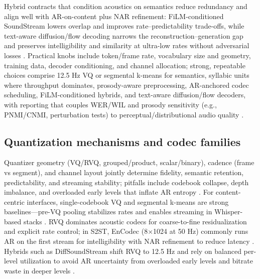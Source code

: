\documentclass{article}
\begin{document}
Hybrid contracts that condition acoustics on semantics reduce redundancy and align well with AR-on-content plus NAR refinement: FiLM-conditioned SoundStream lowers overlap and improves rate--predictability trade-offs, while text-aware diffusion/flow decoding narrows the reconstruction--generation gap and preserves intelligibility and similarity at ultra-low rates without adversarial losses \cite{yang2025diffsoundstreamefficientspeechtokenizati,peng2024mslms2stmultitaskspeechlanguagemodeltext,wang2025tadicodectextawarediffusionspeechtokeniz}. Practical knobs include token/frame rate, vocabulary size and geometry, training data, decoder conditioning, and channel allocation; strong, repeatable choices comprise 12.5 Hz VQ or segmental k-means for semantics, syllabic units where throughput dominates, prosody-aware preprocessing, AR-anchored codec scheduling, FiLM-conditioned hybrids, and text-aware diffusion/flow decoders, with reporting that couples WER/WIL and prosody sensitivity (e.g., PNMI/CNMI, perturbation tests) to perceptual/distributional audio quality \cite{zeng2024scalingspeechtextpretrainingsyntheticint,kando2025exploringeffectsegmentationvocabularysiz,baade2024syllablelmlearningcoarsesemanticunitsspe,onda2025benchmarkingprosodyencodingdiscretespeec,li2024investigatingneuralaudiocodecsspeechlang,yang2025diffsoundstreamefficientspeechtokenizati,wang2025tadicodectextawarediffusionspeechtokeniz,guo2025recentadvancesdiscretespeechtokensreview}.

\subsection{Quantization mechanisms and codec families} \label{subsec:quantizationmechanismsandcodecfamilies}
Quantizer geometry (VQ/RVQ, grouped/product, scalar/binary), cadence (frame vs segment), and channel layout jointly determine fidelity, semantic retention, predictability, and streaming stability; pitfalls include codebook collapse, depth imbalance, and overloaded early levels that inflate AR entropy \cite{zeng2024scalingspeechtextpretrainingsyntheticint}. For content-centric interfaces, single-codebook VQ and segmental k-means are strong baselines---pre-VQ pooling stabilizes rates and enables streaming in Whisper-based stacks \cite{baade2024syllablelmlearningcoarsesemanticunitsspe,zeng2024scalingspeechtextpretrainingsyntheticint}. RVQ dominates acoustic codecs for coarse-to-fine residualization and explicit rate control; in S2ST, EnCodec (8$\times$1024 at 50 Hz) commonly runs AR on the first stream for intelligibility with NAR refinement to reduce latency \cite{peng2024mslms2stmultitaskspeechlanguagemodeltext}. Hybrids such as DiffSoundStream shift RVQ to 12.5 Hz and rely on balanced per-level utilization to avoid AR uncertainty from overloaded early levels and bitrate waste in deeper levels \cite{yang2025diffsoundstreamefficientspeechtokenizati}.
\end{document}
